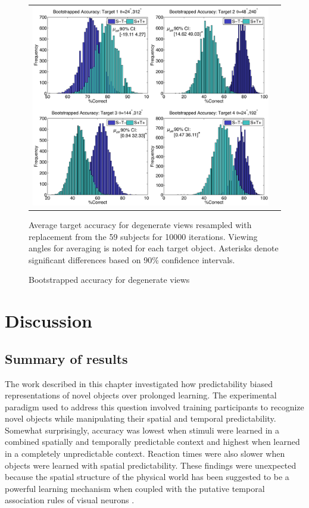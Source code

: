 \documentclass[dwyatte_dissertation.tex]{subfiles}
\begin{document}
\begin{figure}[h!]
\begin{center}
\begin{tabular}{ll}
\includegraphics[width=160mm]{figs/chap_bpleast/results_bootstrap_montage.pdf}
\end{tabular}
\end{center}
\caption{Bootstrapped accuracy for degenerate views}{Average target accuracy for degenerate views resampled with replacement from the 59 subjects for 10000 iterations. Viewing angles for averaging is noted for each target object. Asterisks denote significant differences based on 90\% confidence intervals.}
\label{fig:bpleast_behave_bootstrap}
\end{figure}

\section{Discussion}\subsection{Summary of results}
The work described in this chapter investigated how predictability biased representations of novel objects over prolonged learning. The experimental paradigm used to address this question involved training participants to recognize novel objects while manipulating their spatial and temporal predictability. Somewhat surprisingly, accuracy was lowest when stimuli were learned in a combined spatially and temporally predictable context and highest when learned in a completely unpredictable context. Reaction times were also slower when objects were learned with spatial predictability. These findings were unexpected because the spatial structure of the physical world has been suggested to be a powerful learning mechanism when coupled with the putative temporal association rules of visual neurons \cite{StringerPerryRollsEtAl06,WallisBaddeley97,IsikLeiboPoggio12,SakaiMiyashita91,MeyerOlson11,CoxMeierOerteltEtAl05,LiDiCarlo08,LiDiCarlo10,LiDiCarlo12}.
\end{document}
